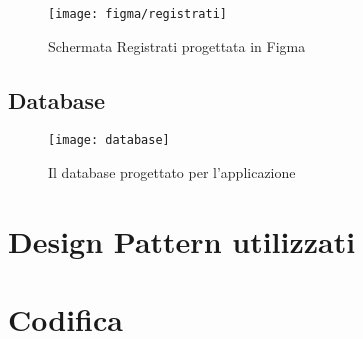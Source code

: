 \begin{figure}[!h] 
    \centering 
    \texttt{[image: figma/registrati]} 
    \caption{Schermata Registrati progettata in Figma}
    \label{fig:registratifigma}
\end{figure}

\newpage

\subsection{Database}

\begin{figure}[!h] 
    \centering 
    \texttt{[image: database]} 
    \caption{Il database progettato per l'applicazione}
    \label{fig:database}
\end{figure}

\newpage

\section{Design Pattern utilizzati}

\section{Codifica} %
